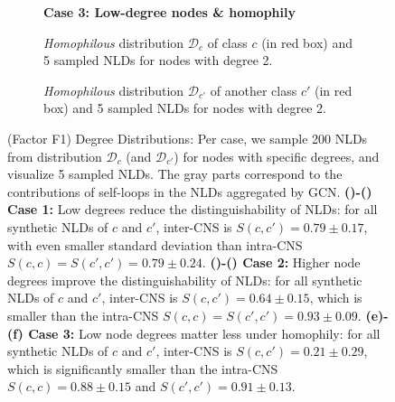 \begin{figure}[tp]
\begin{subfigure}[b]{0.47\textwidth}
        \label{fig:revisit-degree-high-heterophily-2}
    \end{subfigure}
    \begin{subfigure}[b]{\textwidth}
       \caption*{\textbf{Case 3: Low-degree nodes \& homophily}}
           \vspace{-0.6cm}
    \end{subfigure}
    \begin{subfigure}[b]{0.47\textwidth}
        \caption{\emph{Homophilous} distribution $\mathcal{D}_c$ of class $c$ (in red box) and 5 sampled NLDs for nodes with degree 2.}
        \label{fig:revisit-degree-low-homophily-1}
    \end{subfigure}
    \hspace{0.04\textwidth}
    \begin{subfigure}[b]{0.47\textwidth}
        \caption{\emph{Homophilous} distribution $\mathcal{D}_{c'}$ of another class $c'$ (in red box) and 5 sampled NLDs for nodes with degree 2.}
        \label{fig:revisit-degree-low-homophily-2}
    \end{subfigure}
    \caption{{(Factor F1) Degree Distributions}: Per case, we sample 200 NLDs from distribution $\mathcal{D}_c$ (and $\mathcal{D}_{c'}$) for nodes with specific degrees, and visualize 5 sampled NLDs. The gray parts correspond to the contributions of self-loops in the NLDs aggregated by GCN. 
    \textbf{()-() Case 1:} Low degrees reduce the distinguishability of NLDs: for all synthetic NLDs of $c$ and $c'$, inter-CNS is $S(c, c') = 0.79 \pm 0.17$, with even smaller standard deviation than intra-CNS $S(c, c) = S(c', c') = 0.79 \pm 0.24$.  
    \textbf{()-() Case 2:} Higher node degrees improve the distinguishability of NLDs: for all synthetic NLDs of $c$ and $c'$, inter-CNS is $S(c, c') = 0.64 \pm 0.15$, which is smaller than the intra-CNS $S(c, c) = S(c', c') = 0.93 \pm 0.09$. 
    \textbf{(e)-(f) Case 3:} Low node degrees matter less under homophily: for all synthetic NLDs of $c$ and $c'$, inter-CNS is $S(c, c') = 0.21 \pm 0.29$, which is significantly smaller than the intra-CNS $S(c, c) = 0.88 \pm 0.15$ and $S(c', c') = 0.91 \pm 0.13$.
    }
    \label{fig:revisit-degree}
\end{figure}



